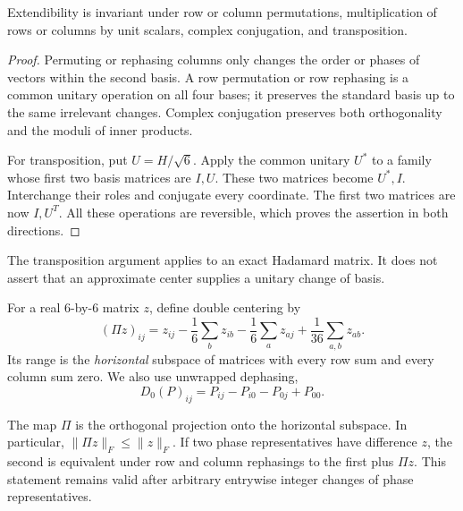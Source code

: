 \begin{lemma}[Equivalences]
\label{seed:equivalences}
Extendibility is invariant under row or column permutations, multiplication
of rows or columns by unit scalars, complex conjugation, and transposition.
\end{lemma}

\begin{proof}
Permuting or rephasing columns only changes the order or phases of vectors
within the second basis.  A row permutation or row rephasing is a common
unitary operation on all four bases; it preserves the standard basis up
to the same irrelevant changes.  Complex conjugation preserves both
orthogonality and the moduli of inner products.

For transposition, put $U=H/\sqrt6$.  Apply the common unitary $U^*$ to a
family whose first two basis matrices are $I,U$.  These two matrices become
$U^*,I$.  Interchange their roles and conjugate every coordinate.  The first
two matrices are now $I,U^T$.  All these operations are reversible, which
proves the assertion in both directions.
\end{proof}

The transposition argument applies to an exact Hadamard matrix.  It does
not assert that an approximate center supplies a unitary change of basis.

For a real $6$-by-$6$ matrix $z$, define double centering by
\begin{equation}
\label{seed:projection-formula}
 (\Pi z)_{ij}
 =z_{ij}-\frac16\sum_bz_{ib}-\frac16\sum_az_{aj}
       +\frac1{36}\sum_{a,b}z_{ab}.
\end{equation}
Its range is the \emph{horizontal} subspace of matrices with every row sum
and every column sum zero.  We also use unwrapped dephasing,
\begin{equation}
\label{seed:dephasing-formula}
 D_0(P)_{ij}=P_{ij}-P_{i0}-P_{0j}+P_{00}.
\end{equation}

\begin{lemma}
\label{seed:horizontal}
The map $\Pi$ is the orthogonal projection onto the horizontal subspace.
In particular, $\|\Pi z\|_F\le\|z\|_F$.  If two phase representatives have
difference $z$, the second is equivalent under row and column rephasings
to the first plus $\Pi z$.  This statement remains valid after arbitrary
entrywise integer changes of phase representatives.
\end{lemma}

